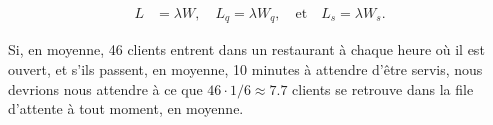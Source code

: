\begin{align*}
L &=  \lambda W, \quad L_{q} = \lambda W_{q}, \quad\mbox{et}
\quad L_{s}= \lambda W_{s}.
\end{align*}
\begin{Exemple} Si, en moyenne, 46 clients entrent dans un restaurant à chaque heure où il est ouvert, et s'ils passent, en moyenne, 10 minutes à attendre d'être servis, nous devrions nous attendre à ce que $46\cdot 1/6 \approx 7.7$ clients se retrouve dans la file d'attente à tout moment, en moyenne. \end{Exemple}

